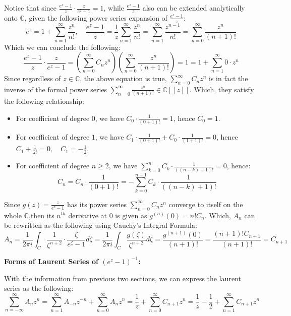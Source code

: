 \documentclass{article}
\begin{document}
Notice that since $\frac{e^z-1}{z}\cdot \frac{z}{e^z-1}=1$, while $\frac{e^z-1}{z}$ also can be extended analytically onto $\mathbb{C}$,
given the following power series expansion of $\frac{e^z-1}{z}$:
$$e^z=1+\sum_{n=1}^{\infty}\frac{z^n}{n!},\quad \frac{e^z-1}{z}=\frac{1}{z}\sum_{n=1}^{\infty}\frac{z^n}{n!}=\sum_{n=1}^{\infty}\frac{z^{n-1}}{n!}=\sum_{n=0}^{\infty}\frac{z^n}{(n+1)!}$$
Which we can conclude the following:
$$\frac{e^z-1}{z}\cdot \frac{z}{e^z-1}=\left(\sum_{n=0}^{\infty}C_nz^n\right)\left(\sum_{n=0}^{\infty}\frac{z^n}{(n+1)!}\right)=1 = 1 + \sum_{n=1}^{\infty}0\cdot z^n$$
Since regardless of $z\in\mathbb{C}$, the above equation is true, $\sum_{n=0}^{\infty}C_nz^n$ is in fact the inverse of the formal power series $\sum_{n=0}^{\infty}\frac{z^n}{(n+1)!}\in \mathbb{C}[[z]]$. Which, they satisfy the following relationship:
\begin{itemize}
    \item For coefficient of degree $0$, we have $C_0\cdot \frac{1}{(0+1)!}=1$, hence $C_0=1$.
    \item For coefficient of degree $1$, we have $C_1\cdot \frac{1}{(0+1)!}+C_0\cdot\frac{1}{(1+1)!}=0$, hence $C_1+\frac{1}{2!}=0,\quad C_1=-\frac{1}{2}$.
    \item For coefficient of degree $n\geq 2$, we have $\sum_{k=0}^{n}C_k\cdot \frac{1}{((n-k)+1)!}=0$, hence: 
    $$C_n=C_n\cdot\frac{1}{(0+1)!} = -\sum_{k=0}^{n-1}C_k\cdot\frac{1}{((n-k)+1)!}$$
\end{itemize}

\hfil

Since $g(z)=\frac{z}{e^z-1}$ has its power series $\sum_{n=0}^{\infty}C_nz^n$ converge to itself on the whole $\mathbb{C}$,then its $n^{th}$ derivative at $0$ is given as $g^{(n)}(0)=n!C_n$. Which, $A_n$ can be rewritten as the following using Cauchy's Integral Formula:
$$A_n=\frac{1}{2\pi i}\int_{C}\frac{1}{\zeta^{n+2}}\cdot\frac{\zeta}{e^\zeta-1}d\zeta=\frac{1}{2\pi i}\int_{C}\frac{g(\zeta)}{\zeta^{n+2}}d\zeta = \frac{g^{(n+1)}(0)}{(n+1)!}=\frac{(n+1)!C_{n+1}}{(n+1)!}=C_{n+1}$$

\hfil

\textbf{Forms of Laurent Series of $(e^z-1)^{-1}$:}

With the information from previous two sections, we can express the laurent series as the following:
$$\sum_{n=-\infty}^{\infty}A_nz^n = \sum_{n=1}^{\infty}A_{-n}z^{-n}+\sum_{n=0}^{\infty}A_nz^n = \frac{1}{z}+\sum_{n=0}^{\infty}C_{n+1}z^n = \frac{1}{z}-\frac{1}{2}+\sum_{n=1}^{\infty}C_{n+1}z^n$$
\end{document}
